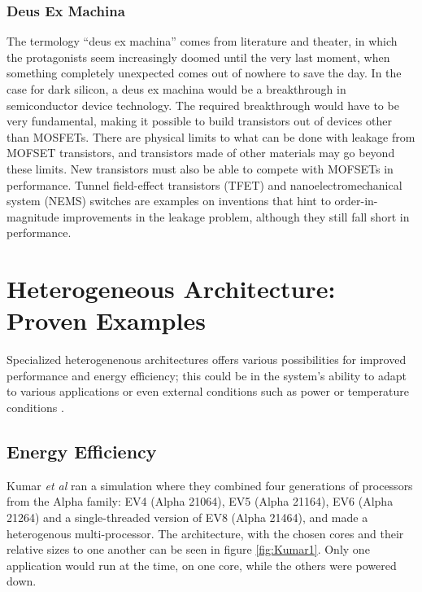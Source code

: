 \subsubsection{Deus Ex Machina}
The termology ``deus ex machina'' comes from literature and theater, in which the protagonists seem increasingly doomed until the very last moment, when something completely unexpected comes out of nowhere to save the day.
In the case for dark silicon, a deus ex machina would be a breakthrough in semiconductor device technology.
The required breakthrough would have to be very fundamental, making it possible to build transistors out of devices other than MOSFETs. 
There are physical limits to what can be done with %
leakage from MOFSET transistors, and transistors made of other materials may go beyond these limits.
New transistors must also be able to compete with MOFSETs in performance.
Tunnel field-effect transistors (TFET) and nanoelectromechanical system (NEMS) switches are examples on inventions that hint to order-in-magnitude improvements in the leakage problem, although they still fall short in performance. \cite{dark-silicon}

\section{Heterogeneous Architecture: Proven Examples}
\label{sec:heterogeneous}

Specialized heterogenenous architectures offers various possibilities for improved performance and energy efficiency;
this could be in the system's ability to adapt to various applications or even external conditions such as
power or temperature conditions \cite{heterogeneous-ee, heterogeneous-perf, heterogeneous-arch}.

\subsection{Energy Efficiency}
\label{subsec:rw_ee} 
Kumar \textit{et al} \cite{heterogeneous-ee} ran a simulation where they combined four generations of processors from the Alpha family: EV4 (Alpha 21064), EV5 (Alpha 21164), EV6 (Alpha 21264) and a single-threaded version of EV8 (Alpha 21464), and made a heterogenous multi-processor.
The architecture, with the chosen cores and their relative sizes to one another can be seen in figure \ref{fig:Kumar1}.
Only one application would run at the time, on one core, while the others were powered down.

